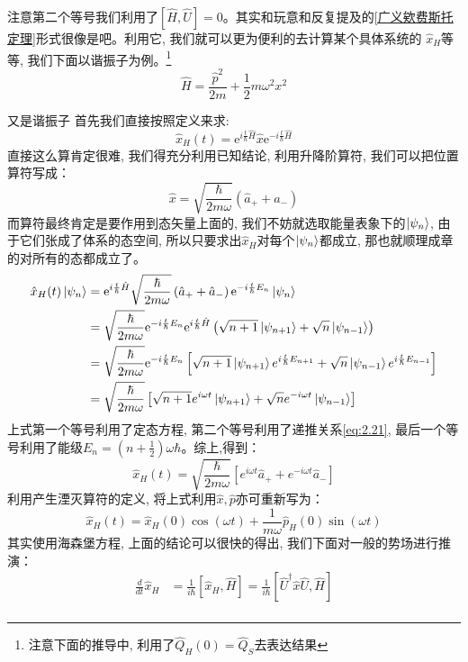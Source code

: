 \documentclass[a4paper,zihao=-4,linespread=1]{ctexrep}
\begin{document}
    注意第二个等号我们利用了$\left[\hat{H},\hat{U}\right]=0$。其实和玩意和反复提及的\ref{广义欸费斯托定理}形式很像是吧。利用它, 我们就可以更为便利的去计算某个具体系统的
    $\hat{x}_H$等等, 我们下面以谐振子为例。\footnote{注意下面的推导中, 利用了$\hat{Q}_H(0)=\hat{Q}_S$去表达结果}
    \[\hat{H}=\frac{\hat{p}^2}{2m}+\frac{1}{2}m\omega^2x^2\]
    \begin{example}{又是谐振子}
        首先我们直接按照定义来求:
        \[\hat{x}_H(t)=\mathrm e^{i\frac{t}{\hbar}\hat{H}}\hat{x}\mathrm e^{-i\frac{t}{\hbar}\hat{H}}\]
        直接这么算肯定很难, 我们得充分利用已知结论, 利用升降阶算符, 我们可以把位置算符写成：
        \[\hat{x}=\sqrt{\frac{\hbar}{2m\omega}}\left(\hat{a}_++\hat{a}_-\right)\]
        而算符最终肯定是要作用到态矢量上面的, 我们不妨就选取能量表象下的$\ket{\psi_n}$, 由于它们张成了体系的态空间, 所以只要求出$\hat{x}_H$对每个$\ket{\psi_n}$都成立, 那也就顺理成章的对所有的态都成立了。
        \begin{align*}
            \hat{x}_H(t)\ket{\psi_n}&=\mathrm e^{i\frac{t}{\hbar}\hat{H}}\sqrt{\frac{\hbar}{2m\omega}}\left(\hat{a}_++\hat{a}_-\right)\mathrm e^{-i\frac{t}{\hbar}E_n}\ket{\psi_n}\\
            &=\sqrt{\frac{\hbar}{2m\omega}}\mathrm e^{-i\frac{t}{\hbar}E_n}\mathrm e^{i\frac{t}{\hbar}\hat{H}}\left(\sqrt{n+1}\ket{\psi_{n+1}}+\sqrt{n}\ket{\psi_{n-1}}\right)\\
            &=\sqrt{\frac{\hbar}{2m\omega}}\mathrm e^{-i\frac{t}{\hbar}E_n}\left[\sqrt{n+1}\ket{\psi_{n+1}}e^{i\frac{t}{\hbar}E_{n+1}}+\sqrt{n}\ket{\psi_{n-1}}e^{i\frac{t}{\hbar}E_{n-1}}\right]\\
            &=\sqrt{\frac{\hbar}{2 m \omega}}\left[\sqrt{n+1} e^{i \omega t} \ket{\psi_{n+1}}+\sqrt{n} e^{-i \omega t} \ket{\psi_{n-1}}\right]
        \end{align*}
        上式第一个等号利用了定态方程, 第二个等号利用了递推关系\ref{eq:2.21}, 最后一个等号利用了能级$E_n=(n+\frac{1}{2})\omega\hbar$。综上,得到：
        \[\hat{x}_{H}(t)=\sqrt{\frac{\hbar}{2 m \omega}}\left[e^{i \omega t} \hat{a}_{+}+e^{-i \omega t} \hat{a}_{-}\right]\]
        利用产生湮灭算符的定义, 将上式利用$\hat{x},\hat{p}$亦可重新写为：
        \[\hat{x}_{H}(t)=\hat{x}_{H}(0) \cos (\omega t)+\frac{1}{m \omega} \hat{p}_{H}(0) \sin (\omega t)\]
        其实使用海森堡方程, 上面的结论可以很快的得出, 我们下面对一般的势场进行推演：
        \begin{equation}
            \begin{aligned}
                \frac{d}{d t} \hat{x}_{H} &=\frac{1}{i \hbar}\left[\hat{x}_{H}, \hat{H}\right]=\frac{1}{i \hbar}\left[\hat{U}^{\dagger} \hat{x} \hat{U}, \hat{H}\right] \\

\end{aligned}
\end{equation}
\end{example}
\end{document}
